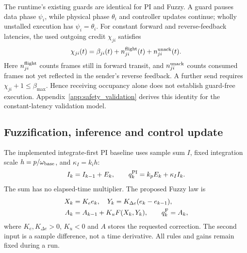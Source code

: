 The runtime's existing guards are identical for PI and Fuzzy.
A guard pauses data phase $\psi_i$, while physical phase $\theta_i$
and controller updates continue; wholly unstalled execution has
$\psi_i=\theta_i$. For constant forward and reverse-feedback
latencies, the used outgoing credit $\chi_{ji}$ satisfies
\begin{equation}
 \chi_{ji}(t)=\beta_{ji}(t)+n^{\rm flight}_{ji}(t)
                         +n^{\rm unack}_{ji}(t).
 \label{eq:fpi_credit_decomposition}
\end{equation}
Here $n^{\rm flight}_{ji}$ counts frames still in forward transit,
and $n^{\rm unack}_{ji}$ counts consumed frames not yet reflected
in the sender's reverse feedback. A further send requires
$\chi_{ji}+1\le \beta_{\max}$. Hence receiving occupancy alone does not establish
guard-free execution. Appendix~\ref{app:safety_validation} derives
this identity for the constant-latency validation model.

\subsection{Fuzzification, inference and control update}
The implemented integrate-first PI baseline uses sample sum $I$, fixed integration
scale $h=p/\omega_{\rm base}$, and $\kappa_I=k_ih$:
\begin{equation}
 I_k=I_{k-1}+E_k,\qquad q_k^{\rm PI}=k_pE_k+\kappa_I I_k.
 \label{eq:fpi_native}
\end{equation}
The sum has no elapsed-time multiplier. The proposed Fuzzy law is
\begin{align}
 X_k&=K_e e_k,\quad Y_k=K_{\Delta e}(e_k-e_{k-1}),\nonumber\\
 A_k&=A_{k-1}+K_uF(X_k,Y_k),\qquad q_k^{\rm F}=A_k,
 \label{eq:fpi_fuzzy_law}
\end{align}
where $K_e,K_{\Delta e}>0$, $K_u<0$ and $A$ stores the requested
correction. The second input is a sample difference, not a time
derivative. All rules and gains remain fixed during a run.

